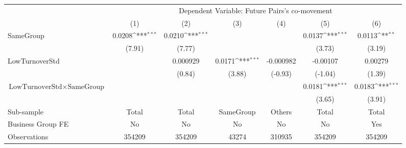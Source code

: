 {
\def\sym#1{\ifmmode^{#1}\else\(^{#1}\)\fi}
\begin{tabular}{l*{6}{c}}
\hline\hline
                &\multicolumn{6}{c}{Dependent Variable:  Future Pairs's co-movement}                                              \\\cmidrule(lr){2-7}
                &\multicolumn{1}{c}{(1)}         &\multicolumn{1}{c}{(2)}         &\multicolumn{1}{c}{(3)}         &\multicolumn{1}{c}{(4)}         &\multicolumn{1}{c}{(5)}         &\multicolumn{1}{c}{(6)}         \\
\hline
SameGroup       &   0.0208\sym{***}&   0.0210\sym{***}&                  &                  &   0.0137\sym{***}&   0.0113\sym{**} \\
                &   (7.91)         &   (7.77)         &                  &                  &   (3.73)         &   (3.19)         \\
[1em]
LowTurnoverStd  &                  & 0.000929         &   0.0171\sym{***}&-0.000982         & -0.00107         &  0.00279         \\
                &                  &   (0.84)         &   (3.88)         &  (-0.93)         &  (-1.04)         &   (1.39)         \\
[1em]
$ {\text{LowTurnoverStd} } \times {\text{SameGroup} }  $ &                  &                  &                  &                  &   0.0181\sym{***}&   0.0183\sym{***}\\
                &                  &                  &                  &                  &   (3.65)         &   (3.91)         \\
\hline
Sub-sample      &    Total         &    Total         &SameGroup         &   Others         &    Total         &    Total         \\
Business Group FE&       No         &       No         &       No         &       No         &       No         &      Yes         \\
Observations    &   354209         &   354209         &    43274         &   310935         &   354209         &   354209         \\
\hline\hline  \end{tabular}}
